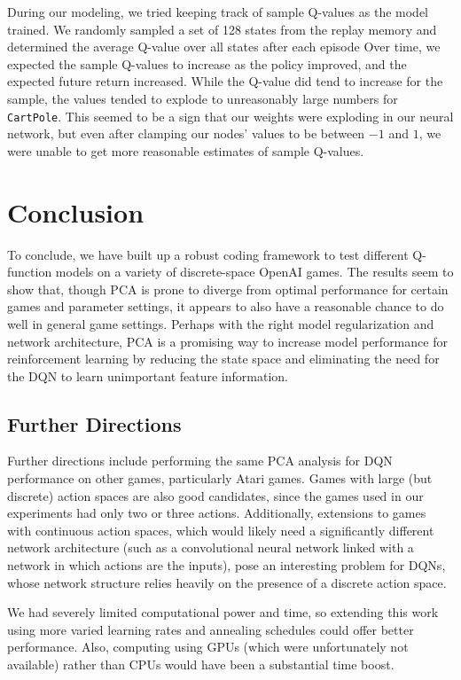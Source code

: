 \documentclass[11pt]{article}
\newcommand{\cp}{\texttt{CartPole}}
\begin{document}
During our modeling, we tried keeping track of sample Q-values as the model trained. We randomly sampled a set of 128 states from the replay memory and determined the average Q-value over all states after each episode Over time, we expected the sample Q-values to increase as the policy improved, and the expected future return increased. While the Q-value did tend to increase for the sample, the values tended to explode to unreasonably large numbers for \cp. This seemed to be a sign that our weights were exploding in our neural network, but even after clamping our nodes' values to be between $-1$ and $1$, we were unable to get more reasonable estimates of sample Q-values. 

\section{Conclusion}

To conclude, we have built up a robust coding framework to test different Q-function models on a variety of discrete-space OpenAI games. The results seem to show that, though PCA is prone to diverge from optimal performance for certain games and parameter settings, it appears to also have a reasonable chance to do well in general game settings. Perhaps with the right model regularization and network architecture, PCA is a promising way to increase model performance for reinforcement learning by reducing the state space and eliminating the need for the DQN to learn unimportant feature information.

\subsection{Further Directions}

Further directions include performing the same PCA analysis for DQN performance on other games, particularly Atari games. Games with large (but discrete) action spaces are also good candidates, since the games used in our experiments had only two or three actions. Additionally, extensions to games with continuous action spaces, which would likely need a significantly different network architecture (such as a convolutional neural network linked with a network in which actions are the inputs), pose an interesting problem for DQNs, whose network structure relies heavily on the presence of a discrete action space.

We had severely limited computational power and time, so extending this work using more varied learning rates and annealing schedules could offer better performance. Also, computing using GPUs (which were unfortunately not available) rather than CPUs would have been a substantial time boost.
\end{document}
